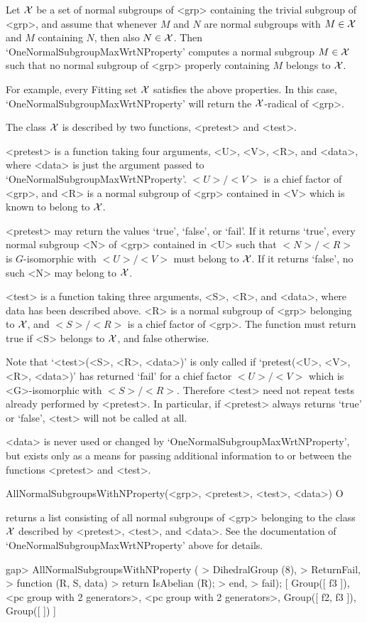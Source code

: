 Let $\cal X$ be a set of normal subgroups of <grp> containing the trivial
subgroup of <grp>, and assume that whenever
$M$ and $N$ are normal subgroups with $M \in \cal X$ and $M$
containing $N$, then also $N \in \cal X$. Then
`OneNormalSubgroupMaxWrtNProperty' computes a normal subgroup $M \in \cal X$
such that no normal subgroup of <grp> properly containing $M$ belongs to $\cal
X$. 

For example, every Fitting set $\cal X$ satisfies the above properties. In
this case, `OneNormalSubgroupMaxWrtNProperty' will return the $\cal
X$-radical of <grp>.

The class $\cal X$ is described by two functions, <pretest> and <test>. 

<pretest> is a function taking four arguments, <U>, <V>, <R>, and <data>,
where <data> is just the argument passed to
`OneNormalSubgroupMaxWrtNProperty'. $<U>/<V>$ is a chief factor of <grp>,
and  <R> is a normal subgroup of <grp> contained in <V> which is known to
belong to
$\cal X$.

<pretest> may return the values `true', `false', or `fail'. If it returns 
`true', every normal subgroup <N> of <grp> contained in <U> such that
$<N>/<R>$ is 
$G$-isomorphic with $<U>/<V>$ must belong to $\cal X$. If it returns `false',
no such <N> may belong to $\cal X$. 

<test> is a function taking three arguments, <S>, <R>, and <data>, where
data has been described above. <R> is a normal subgroup of <grp> belonging to
$\cal X$, and $<S>/<R>$ is a chief factor of <grp>. The function must return
true if <S> belongs to $\cal X$, and false otherwise. 

Note that `<test>(<S>, <R>, <data>)' is only called if `pretest(<U>, <V>,
<R>, <data>)' has returned `fail' for a chief factor $<U>/<V>$ which is
<G>-isomorphic with $<S>/<R>$. Therefore <test> need not repeat tests
already performed by <pretest>. In particular, if <pretest> always returns
`true' or `false', <test> will not be called at all.

<data> is never used or changed by `OneNormalSubgroupMaxWrtNProperty', but
exists only as a means for passing additional information to or between
the functions <pretest> and <test>.


\>AllNormalSubgroupsWithNProperty(<grp>, <pretest>, <test>, <data>) O

returns a list consisting of all normal subgroups of <grp> belonging 
to the class $\cal X$ described by <pretest>, <test>, and <data>. See
the documentation of `OneNormalSubgroupMaxWrtNProperty' above for details.

\beginexample
gap> AllNormalSubgroupsWithNProperty (
> DihedralGroup (8),
>     ReturnFail,
>     function (R, S, data)
>         return IsAbelian (R);
>     end,
>     fail);
[ Group([ f3 ]), <pc group with 2 generators>, <pc group with 2 generators>,
  Group([ f2, f3 ]), Group([  ]) ]
\endexample

